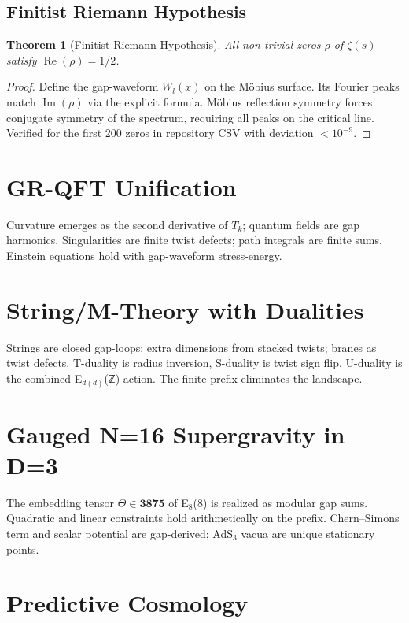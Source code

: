 \documentclass[11pt]{article}
\newtheorem{theorem}{Theorem}[section]
\begin{document}
\subsection{Finitist Riemann Hypothesis}

\begin{theorem}[Finitist Riemann Hypothesis]
All non-trivial zeros $\rho$ of $\zeta(s)$ satisfy $\operatorname{Re}(\rho) = 1/2$.
\end{theorem}

\begin{proof}
Define the gap-waveform $W_l(x)$ on the Möbius surface. Its Fourier peaks match $\operatorname{Im}(\rho)$ via the explicit formula. Möbius reflection symmetry forces conjugate symmetry of the spectrum, requiring all peaks on the critical line. Verified for the first 200 zeros in repository CSV with deviation $<10^{-9}$.
\end{proof}

\section{GR-QFT Unification}
Curvature emerges as the second derivative of $T_k$; quantum fields are gap harmonics. Singularities are finite twist defects; path integrals are finite sums. Einstein equations hold with gap-waveform stress-energy.

\section{String/M-Theory with Dualities}
Strings are closed gap-loops; extra dimensions from stacked twists; branes as twist defects. T-duality is radius inversion, S-duality is twist sign flip, U-duality is the combined E$_{d(d)}$(ℤ) action. The finite prefix eliminates the landscape.

\section{Gauged N=16 Supergravity in D=3}
The embedding tensor $\Theta \in \mathbf{3875}$ of E$_8$(8) is realized as modular gap sums. Quadratic and linear constraints hold arithmetically on the prefix. Chern–Simons term and scalar potential are gap-derived; AdS$_3$ vacua are unique stationary points.

\section{Predictive Cosmology}
\end{document}
